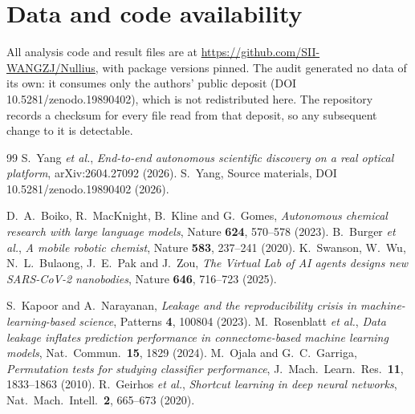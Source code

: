 \documentclass[11pt,a4paper]{article}
\begin{document}
\section*{Data and code availability}
All analysis code and result files are at
\url{https://github.com/SII-WANGZJ/Nullius}, with package versions pinned. The
audit generated no data of its own: it consumes only the authors' public
deposit (DOI 10.5281/zenodo.19890402), which is not redistributed here. The
repository records a checksum for every file read from that deposit, so any
subsequent change to it is detectable.

\begin{thebibliography}{99}\small
{} S.~Yang \emph{et al.},
  \emph{End-to-end autonomous scientific discovery on a real optical
  platform}, arXiv:2604.27092 (2026).
 S.~Yang, Source materials, DOI 10.5281/zenodo.19890402 (2026).

 D.~A.~Boiko, R.~MacKnight, B.~Kline and G.~Gomes,
  \emph{Autonomous chemical research with large language models},
  Nature \textbf{624}, 570--578 (2023).
 B.~Burger \emph{et al.},
  \emph{A mobile robotic chemist}, Nature \textbf{583}, 237--241 (2020).
 K.~Swanson, W.~Wu, N.~L.~Bulaong, J.~E.~Pak and J.~Zou,
  \emph{The Virtual Lab of AI agents designs new SARS-CoV-2 nanobodies},
  Nature \textbf{646}, 716--723 (2025).

 S.~Kapoor and A.~Narayanan,
  \emph{Leakage and the reproducibility crisis in machine-learning-based
  science}, Patterns \textbf{4}, 100804 (2023).
 M.~Rosenblatt \emph{et al.},
  \emph{Data leakage inflates prediction performance in connectome-based
  machine learning models}, Nat.\ Commun.\ \textbf{15}, 1829 (2024).
 M.~Ojala and G.~C.~Garriga,
  \emph{Permutation tests for studying classifier performance},
  J.\ Mach.\ Learn.\ Res.\ \textbf{11}, 1833--1863 (2010).
 R.~Geirhos \emph{et al.},
  \emph{Shortcut learning in deep neural networks},
  Nat.\ Mach.\ Intell.\ \textbf{2}, 665--673 (2020).


\end{thebibliography}
\end{document}

